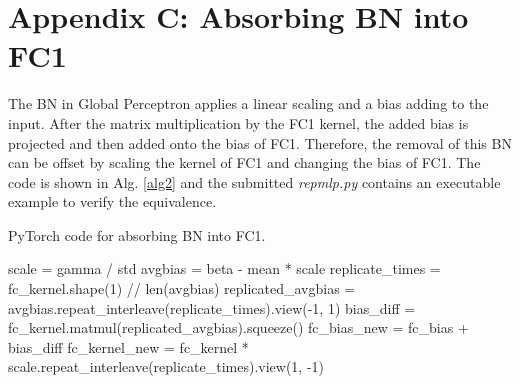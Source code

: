 \documentclass[10pt,twocolumn,letterpaper]{article}
\begin{document}
\section*{Appendix C: Absorbing BN into FC1}

The BN in Global Perceptron applies a linear scaling and a bias adding to the input. After the matrix multiplication by the FC1 kernel, the added bias is projected and then added onto the bias of FC1. Therefore, the removal of this BN can be offset by scaling the kernel of FC1 and changing the bias of FC1. The code is shown in Alg. \ref{alg2} and the submitted \textit{repmlp.py} contains an executable example to verify the equivalence.


\begin{algorithm*}
	\vskip -0.03in
	\caption{PyTorch code for absorbing BN into FC1.}
	\label{alg2}
	\begin{algorithmic}
		\STATE scale = gamma / std
		\STATE avgbias = beta - mean * scale
		\STATE replicate\_times = fc\_kernel.shape(1) // len(avgbias)
		\STATE replicated\_avgbias = avgbias.repeat\_interleave(replicate\_times).view(-1, 1)
		\STATE bias\_diff = fc\_kernel.matmul(replicated\_avgbias).squeeze()
		\STATE fc\_bias\_new = fc\_bias + bias\_diff
		\STATE fc\_kernel\_new = fc\_kernel * scale.repeat\_interleave(replicate\_times).view(1, -1)
		
	\end{algorithmic}
	\vskip -0.03in
\end{algorithm*} 
\end{document}

